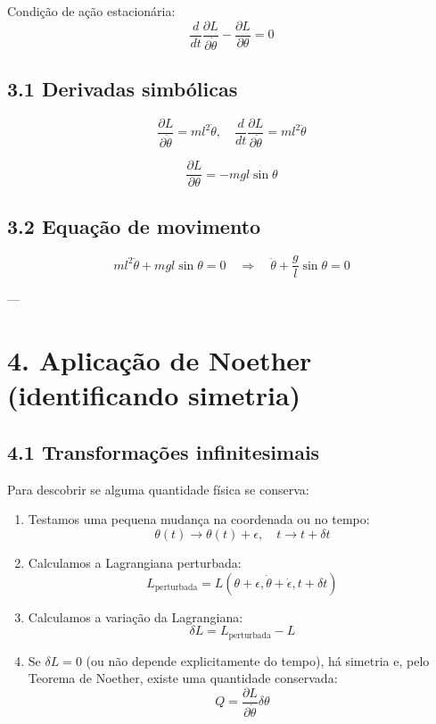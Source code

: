 \documentclass[12pt]{article}
\begin{document}
Condição de ação estacionária:
\[
\frac{d}{dt} \frac{\partial L}{\partial \dot{\theta}} - \frac{\partial L}{\partial \theta} = 0
\]

\subsection*{3.1 Derivadas simbólicas}
\[
\frac{\partial L}{\partial \dot{\theta}} = m l^2 \dot{\theta}, \quad 
\frac{d}{dt} \frac{\partial L}{\partial \dot{\theta}} = m l^2 \ddot{\theta}
\]

\[
\frac{\partial L}{\partial \theta} = - m g l \sin\theta
\]

\subsection*{3.2 Equação de movimento}
\[
m l^2 \ddot{\theta} + m g l \sin\theta = 0
\quad \Rightarrow \quad
\ddot{\theta} + \frac{g}{l} \sin\theta = 0
\]

---

\section*{4. Aplicação de Noether (identificando simetria)}

\subsection*{4.1 Transformações infinitesimais}
Para descobrir se alguma quantidade física se conserva:

\begin{enumerate}
    \item Testamos uma pequena mudança na coordenada ou no tempo:
\[
    \theta(t) \to \theta(t) + \epsilon, \quad t \to t + \delta t
\]
    
    \item Calculamos a Lagrangiana perturbada:
\[
    L_{\text{perturbada}} = L(\theta+\epsilon, \dot{\theta}+\dot{\epsilon}, t+\delta t)
\]
    
    \item Calculamos a variação da Lagrangiana:
\[
    \delta L = L_{\text{perturbada}} - L
\]
    
    \item Se $\delta L = 0$ (ou não depende explicitamente do tempo), há simetria e, pelo Teorema de Noether, existe uma quantidade conservada:
\[
    Q = \frac{\partial L}{\partial \dot{\theta}} \delta \theta
\]
\end{enumerate}
\end{document}
